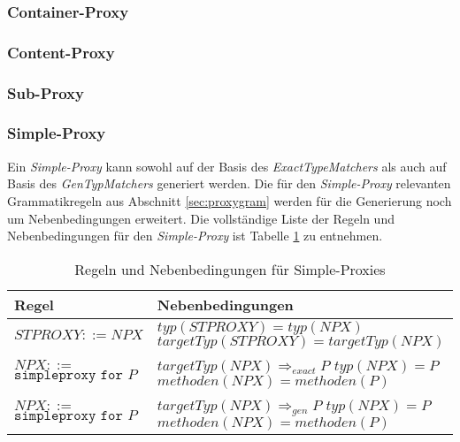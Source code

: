 \documentclass[a4paper,12pt]{article}
\begin{document}
\subsubsection{Container-Proxy}
\subsubsection{Content-Proxy}
\subsubsection{Sub-Proxy}
\subsubsection{Simple-Proxy}
Ein \emph{Simple-Proxy} kann sowohl auf der Basis des \emph{ExactTypeMatchers} als auch auf Basis des \emph{GenTypMatchers} generiert werden. Die für den \emph{Simple-Proxy} relevanten Grammatikregeln aus Abschnitt \ref{sec:proxygram} werden für die Generierung noch um Nebenbedingungen erweitert. Die vollständige Liste der Regeln und Nebenbedingungen für den \emph{Simple-Proxy} ist Tabelle \ref{tab:simpleproxy} zu entnehmen.

\begin{table}[H]
\centering
\begin{tabular}{|p{4cm}|p{10cm}|}
\hline
\hline
\centering\textbf{Regel} & \textbf{Nebenbedingungen} \\
\hline
\hline
$\mathit{STPROXY} ::= NPX$ &
$\mathit{typ(STPROXY)}=\mathit{typ(NPX)}$\newline
$\mathit{targetTyp(STPROXY)} = \mathit{targetTyp(NPX)}$\\
\hline
$\mathit{NPX} ::=$ \newline $\texttt{simpleproxy } \texttt{for } P$ & 
$\mathit{targetTyp(NPX)} \Rightarrow_{exact} P $\newline
$\mathit{typ(NPX)}=P$\newline
$\mathit{methoden(NPX)} = \mathit{methoden(P)}$\\
\hline
$\mathit{NPX} ::=$ \newline $\texttt{simpleproxy } \texttt{for } P$ & 
$\mathit{targetTyp(NPX)} \Rightarrow_{gen} P $\newline
$\mathit{typ(NPX)}=P$\newline
$\mathit{methoden(NPX)} = \mathit{methoden(P)}$
\\
\hline
\hline
\end{tabular}
\caption{Regeln und Nebenbedingungen für Simple-Proxies}
 \label{tab:simpleproxy}
\end{table}
\end{document}

